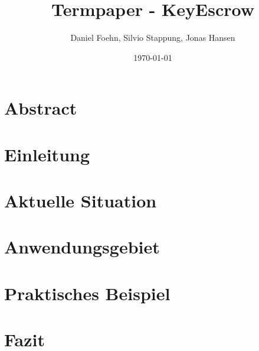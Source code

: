\documentclass[a4paper, 10pt, fleqn]{article}
\title{Termpaper - KeyEscrow}
\author{Daniel Foehn, Silvio Stappung, Jonas Hansen}
\date{\today} %
\newcommand*{\titleGM}{\begingroup %
\hbox{ %
\hspace*{0.2\textwidth} %
\rule{1pt}{\textheight} %
\hspace*{0.05\textwidth} %
\parbox[b]{0.75\textwidth}{ %

{\noindent\Huge\bfseries Termpaper \\[0.5\baselineskip] Key Escrow}\\[2\baselineskip] %
{\large \textit{HSLU Modul - Network \& Cloud Services}}\\[4\baselineskip] %
{\Large \textsc{Daniel Föhn, Jonas Hansen \\[0.5\baselineskip] und Silvio Stappung}} %

\vspace{0.5\textheight} %
{\noindent \today}\\[\baselineskip] %
}}
\endgroup}
\begin{document}
\begin{titlepage}
	\titleGM
	\thispagestyle{empty}
\end{titlepage}

\tableofcontents
\clearpage
\listoffigures
\clearpage

\section*{Abstract}
	
	
\clearpage
\section{Einleitung}
	

\clearpage
\section{Aktuelle Situation}
	

\clearpage
\section{Anwendungsgebiet}
	

\clearpage
\section{Praktisches Beispiel}
	 

\clearpage
\section{Fazit}
	

\nocite{*}
\clearpage


\end{document}
